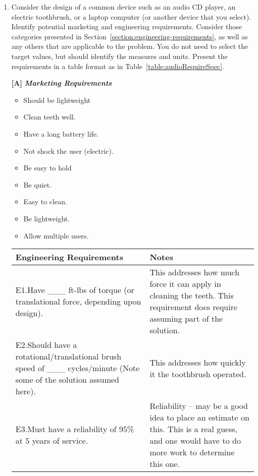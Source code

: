 \begin{enumerate}
  \item
  \label{list:identifyMarkEngr}
    Consider the design of a common device such as an audio CD player,
    an electric toothbrush, or a laptop computer (or another device that
    you select). Identify potential marketing and engineering
    requirements. Consider those categories presented in 
    Section~\ref{section:engineering-requirements}, as
    well as any others that are applicable to the problem. You do not
    need to select the target values, but should identify the measures
    and units. Present the requirements in a table format as in 
    Table~\ref{table:audioRequireSpec}.
    
 \begin{onlysolution}
   \textbf{[A]}
   \itshape
 \textbf{Marketing Requirements}
\begin{itemize}
\item Should be lightweight
\item Clean teeth well.
\item Have a long battery life.
\item Not shock the user (electric).
\item Be easy to hold
\item Be quiet.
\item Easy to clean.
\item Be lightweight.
\item Allow multiple users.
\end{itemize} 

\begin{tabular}{m{6cm}|m{6cm}}
Engineering Requirements & Notes \\ \hline


E1.Have \_\_\_ ft-lbs of torque (or translational force, depending upon design). &
This addresses how much force it can apply in cleaning the teeth. This
requirement does require assuming part of the solution.	\\ \hline

E2.Should have a rotational/translational brush speed of \_\_\_
cycles/minute (Note some of the solution assumed here). &
This addresses how quickly it the toothbrush operated.				\\ \hline

E3.Must have a reliability of 95\% at 5 years of service. &
Reliability -- may be a good idea to place an estimate on this. This is
a real guess, and one would have to do more work to determine this one.	\\ \hline


\end{tabular}
\end{onlysolution}
\end{enumerate}
